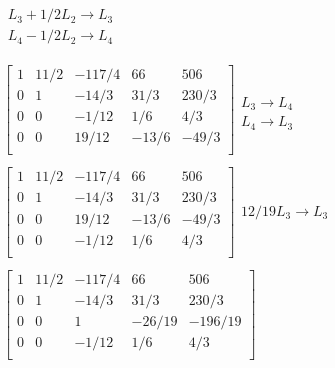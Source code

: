 \documentclass[]{article}
\begin{document}
\[\begin{array}{l}
\begin{array}{l}
\\ 
 L_{3} + 1/2 L_{2} \rightarrow L_{3} \\ 
 L_{4} - 1/2 L_{2} \rightarrow L_{4} \\ 
\end{array}\\
 \\
\left[
\begin{array}{rrrr|r}
1 & 11/2 & -117/4 & 66 & 506 \\ 
0 & 1 & -14/3 & 31/3 & 230/3 \\ 
0 & 0 & -1/12 & 1/6 & 4/3 \\ 
0 & 0 & 19/12 & -13/6 & -49/3 \\ 
\end{array}
\right]\begin{array}{l}
\\ 
\\ 
L_{3} \rightarrow L_{4}\\ 
L_{4} \rightarrow L_{3}\\ 
\end{array}\\
 \\
\left[
\begin{array}{rrrr|r}
1 & 11/2 & -117/4 & 66 & 506 \\ 
0 & 1 & -14/3 & 31/3 & 230/3 \\ 
0 & 0 & 19/12 & -13/6 & -49/3 \\ 
0 & 0 & -1/12 & 1/6 & 4/3 \\ 
\end{array}
\right]\begin{array}{l}
\\ 
\\ 
12/19 L_{3} \rightarrow L_{3}\\ 
\\ 
\end{array}\\
 \\
\left[
\begin{array}{rrrr|r}
1 & 11/2 & -117/4 & 66 & 506 \\ 
0 & 1 & -14/3 & 31/3 & 230/3 \\ 
0 & 0 & 1 & -26/19 & -196/19 \\ 
0 & 0 & -1/12 & 1/6 & 4/3 \\ 
\end{array}
\right]\begin{array}{l}
\\ 
\\ 
\\ 

\end{array}
\end{array}\]
\end{document}
